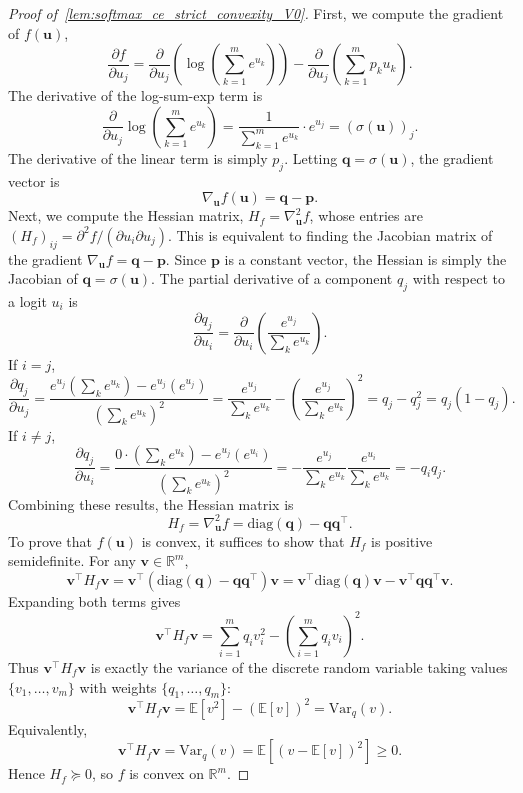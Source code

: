 \documentclass[10pt,a4paper]{amsart}
\begin{document}
\begin{proof}[Proof of~\cref{lem:softmax_ce_strict_convexity_V0}]
First, we compute the gradient of \(f(\boldsymbol{u})\),
\[ \frac{\partial f}{\partial u_j} = \frac{\partial}{\partial u_j} \left( \log\left(\sum_{k=1}^m e^{u_k}\right) \right) - \frac{\partial}{\partial u_j} \left( \sum_{k=1}^m p_k u_k \right). \]
The derivative of the log-sum-exp term is
\[ \frac{\partial}{\partial u_j} \log\left(\sum_{k=1}^m e^{u_k}\right) = \frac{1}{\sum_{k=1}^m e^{u_k}} \cdot e^{u_j} = (\sigma(\boldsymbol{u}))_j. \]
The derivative of the linear term is simply \(p_j\).
Letting \(\boldsymbol{q} = \sigma(\boldsymbol{u})\), the gradient vector is
\[ \nabla_{\boldsymbol{u}} f(\boldsymbol{u}) = \boldsymbol{q} - \boldsymbol{p}. \]
Next, we compute the Hessian matrix, \(H_f = \nabla^2_{\boldsymbol{u}} f\), whose entries are \( (H_f)_{ij} = \partial^2 f/(\partial u_i \partial u_j) \). This is equivalent to finding the Jacobian matrix of the gradient \(\nabla_{\boldsymbol{u}} f = \boldsymbol{q} - \boldsymbol{p}\). Since \(\boldsymbol{p}\) is a constant vector, the Hessian is simply the Jacobian of \(\boldsymbol{q} = \sigma(\boldsymbol{u})\).
The partial derivative of a component \(q_j\) with respect to a logit \(u_i\) is
\[ \frac{\partial q_j}{\partial u_i} = \frac{\partial}{\partial u_i}\left( \frac{e^{u_j}}{\sum_k e^{u_k}} \right). \]
If \(i = j\),
    \[ \frac{\partial q_j}{\partial u_j} = \frac{e^{u_j}\left(\sum_k e^{u_k}\right) - e^{u_j}(e^{u_j})}{\left(\sum_k e^{u_k}\right)^2} = \frac{e^{u_j}}{\sum_k e^{u_k}} - \left(\frac{e^{u_j}}{\sum_k e^{u_k}}\right)^2 = q_j - q_j^2 = q_j(1-q_j). \]
If \(i \neq j\),
    \[ \frac{\partial q_j}{\partial u_i} = \frac{0 \cdot (\sum_k e^{u_k}) - e^{u_j}(e^{u_i})}{\left(\sum_k e^{u_k}\right)^2} = -\frac{e^{u_j}}{\sum_k e^{u_k}}\frac{e^{u_i}}{\sum_k e^{u_k}} = -q_i q_j. \]
Combining these results, the Hessian matrix is
\[ H_f = \nabla^2_{\boldsymbol{u}} f = \mathrm{diag}(\boldsymbol{q}) - \boldsymbol{q}\boldsymbol{q}^\top. \]
To prove that \(f(\boldsymbol{u})\) is convex, it suffices to show that \(H_f\) is positive semidefinite. For any \(\boldsymbol{v} \in \mathbb{R}^m\),
\[
\boldsymbol{v}^\top H_f \boldsymbol{v} = \boldsymbol{v}^\top (\mathrm{diag}(\boldsymbol{q}) - \boldsymbol{q}\boldsymbol{q}^\top) \boldsymbol{v} = \boldsymbol{v}^\top \mathrm{diag}(\boldsymbol{q}) \boldsymbol{v} - \boldsymbol{v}^\top \boldsymbol{q}\boldsymbol{q}^\top \boldsymbol{v}.
\]
Expanding both terms gives
\[
\boldsymbol{v}^\top H_f \boldsymbol{v} = \sum_{i=1}^m q_i v_i^2 - \left(\sum_{i=1}^m q_i v_i\right)^2.
\]
Thus \(\boldsymbol{v}^\top H_f \boldsymbol{v}\) is exactly the variance of the discrete random variable taking values \(\{v_1,\dots,v_m\}\) with weights \(\{q_1,\dots,q_m\}\):
\[
\boldsymbol{v}^\top H_f \boldsymbol{v} = \mathbb{E}[v^2] - (\mathbb{E}[v])^2 = \mathrm{Var}_q(v).
\]
Equivalently,
\[
\boldsymbol{v}^\top H_f \boldsymbol{v} = \mathrm{Var}_q(v) = \mathbb{E} \left[(v-\mathbb{E}[v])^2\right] \ge 0.
\]
Hence \(H_f \succeq 0\), so \(f\) is convex on \(\mathbb{R}^m\).


\end{proof}
\end{document}
